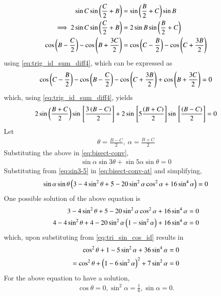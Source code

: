 \begin{enumerate}[label=\thesubsection.\arabic*.,ref=\thesubsection.\theenumi]
\begin{align}
	\sin C
\sin \left(\frac{C}{2}+B\right)
	&=
\sin \left(\frac{B}{2}+C\right)
\sin B
\\
	\implies 2\sin C
\sin \left(\frac{C}{2}+B\right)
	&=
2\sin B
\sin \left(\frac{B}{2}+C\right)
\\
\cos \left(B - \frac{C}{2}\right)
-\cos \left(B + \frac{3C}{2}\right)
	&=
\cos \left(C - \frac{B}{2}\right)
-\cos \left(C + \frac{3B}{2}\right)
\end{align}
using \eqref{eq:trig_id_sum_diff4},
which can be expressed as
\begin{align}
\cos \left(C - \frac{B}{2}\right)
-
\cos \left(B - \frac{C}{2}\right)
-\cos \left(C + \frac{3B}{2}\right)
+
	\cos \left(B + \frac{3C}{2}\right)
	=0
\end{align}
which, using \eqref{eq:trig_id_sum_diff4},
yields
\begin{align}
 2\sin \left( \frac{B +C}{2}\right)
	\sin {}\left[ \frac{3\left(B -C\right)}{2}\right]
	+ 2\sin {}\left[ 5\frac{\left(B +C\right)}{2}\right]
	\sin {}\left[ \frac{\left(B -C\right)}{2}\right]
	=0
\label{eq:bisect-conv}
\end{align}
Let
\begin{align}
	\theta = \frac{B -C}{2},\
	\alpha= \frac{B +C}{2}
\end{align}
Substituting the above in 
\eqref{eq:bisect-conv},
\begin{align}
 \sin \alpha \sin 3\theta
	+ \sin 5 \alpha \sin \theta = 0
\label{eq:bisect-conv-at}
\end{align}
Substituting
from \eqref{eq:sin3-5}
in \eqref{eq:bisect-conv-at} and simplifying,
\begin{align}
 \sin \alpha \sin \theta
	\left(3- 4\sin^2 \theta + 5- 20\sin^2 \alpha \cos^2 \alpha + 16\sin^4\alpha \right) = 0
\end{align}
One possible solution of the above equation is
\begin{align}
	3- 4\sin^2 \theta + 5- 20\sin^2 \alpha \cos^2 \alpha + 16\sin^4\alpha  = 0
	\\
	4- 4\sin^2 \theta + 4- 20\sin^2 \alpha \left(1-\sin^2 \alpha\right) + 16\sin^4\alpha  = 0
\end{align}
which, upon 
substituting from 
\eqref{eq:tri_sin_cos_id}
results in 
\begin{align}
	\cos^2 \theta + 1- 5\sin^2 \alpha  +36 \sin^4\alpha  = 0
	\\
	=
	\cos^2 \theta + \left(1- 6\sin^2 \alpha\right)^2  + 7\sin^2\alpha  = 0
\end{align}
For the above equation to have a solution, 
\begin{align}
	\cos \theta = 0, \sin^2\alpha = \frac{1}{6}, \sin \alpha = 0. 

\end{align}
\end{enumerate}

